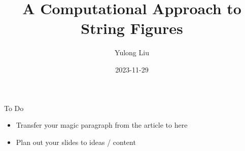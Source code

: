 \documentclass{!beamer}
\title{A Computational Approach to String Figures}
\date{2023-11-29}
\author{Yulong Liu}
\begin{document}
\maketitle




% 

\begin{frame}{To Do}
\begin{itemize}
    \item Transfer your magic paragraph from the article to here
    \item Plan out your slides to ideas / content
\end{itemize}
\end{frame}

\end{document}
